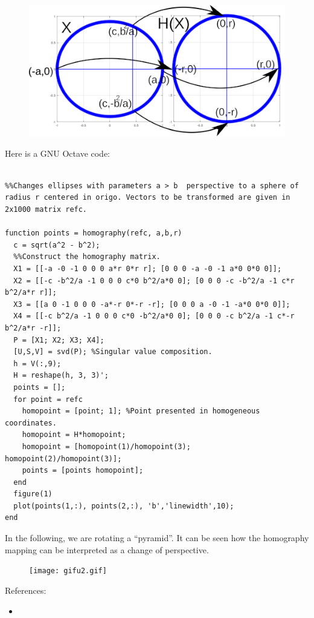 \documentclass{article}
\begin{document}
\begin{figure}
  \includegraphics[width=\linewidth]{homographydrawing.png}
\end{figure}

Here is a GNU Octave code:
\begin{verbatim}

%%Changes ellipses with parameters a > b  perspective to a sphere of radius r centered in origo. Vectors to be transformed are given in 2x1000 matrix refc.

function points = homography(refc, a,b,r)
  c = sqrt(a^2 - b^2);
  %%Construct the homography matrix.
  X1 = [[-a -0 -1 0 0 0 a*r 0*r r]; [0 0 0 -a -0 -1 a*0 0*0 0]];
  X2 = [[-c -b^2/a -1 0 0 0 c*0 b^2/a*0 0]; [0 0 0 -c -b^2/a -1 c*r b^2/a*r r]];
  X3 = [[a 0 -1 0 0 0 -a*-r 0*-r -r]; [0 0 0 a -0 -1 -a*0 0*0 0]];
  X4 = [[-c b^2/a -1 0 0 0 c*0 -b^2/a*0 0]; [0 0 0 -c b^2/a -1 c*-r b^2/a*r -r]];
  P = [X1; X2; X3; X4];
  [U,S,V] = svd(P); %Singular value composition.
  h = V(:,9);
  H = reshape(h, 3, 3)';
  points = [];
  for point = refc
    homopoint = [point; 1]; %Point presented in homogeneous coordinates.
    homopoint = H*homopoint;
    homopoint = [homopoint(1)/homopoint(3); homopoint(2)/homopoint(3)];
    points = [points homopoint];
  end
  figure(1)
  plot(points(1,:), points(2,:), 'b','linewidth',10);
end

\end{verbatim}

In the following, we are rotating a ``pyramid''. It can be seen how the homography mapping can be interpreted as a change of perspective.

\begin{figure}
  \texttt{[image: gifu2.gif]}
\end{figure}

References:
\begin{itemize}
\item {}
\end{itemize}
\end{document}
